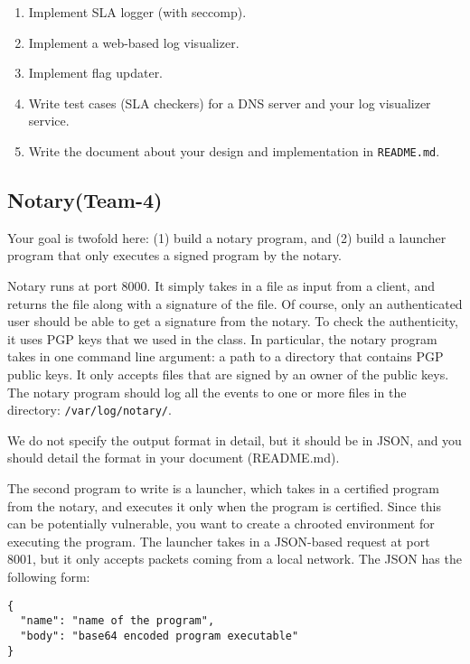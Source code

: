 \documentclass[a4paper, 11pt]{article}
\newcommand*{\Modfour}{Notary\xspace}%
\theoremstyle{definition}
\begin{document}
{\begin{enumerate}
  \item Implement SLA logger (with seccomp).

  \item Implement a web-based log visualizer.

  \item Implement flag updater.

  \item Write test cases (SLA checkers) for a DNS server and your log
    visualizer service.

  \item Write the document about your design and implementation in
    \texttt{README.md}.

\end{enumerate}

\subsection{\Modfour (Team-4)} \label{ss:notary}

Your goal is twofold here: (1) build a notary program, and (2) build a
launcher program that only executes a signed program by the notary.

Notary runs at port 8000. It simply takes in a file as input from a
client, and returns the file along with a signature of the file. Of
course, only an authenticated user should be able to get a signature
from the notary. To check the authenticity, it uses PGP keys that we
used in the class. In particular, the notary program takes in one
command line argument: a path to a directory that contains PGP public
keys. It only accepts files that are signed by an owner of the public
keys.
%
The notary program should log all the events to one or more files in
the directory: \texttt{/var/log/notary/}.

We do not specify the output format in detail, but it should be in
JSON, and you should detail the format in your document (README.md).

The second program to write is a launcher, which takes in a certified
program from the notary, and executes it only when the program is
certified. Since this can be potentially vulnerable, you want to
create a chrooted environment for executing the program. The launcher
takes in a JSON-based request at port 8001, but it only accepts
packets coming from a local network. The JSON has the following form:

\begin{lstlisting}
{
  "name": "name of the program",
  "body": "base64 encoded program executable"
}
\end{lstlisting}

}
\end{document}
